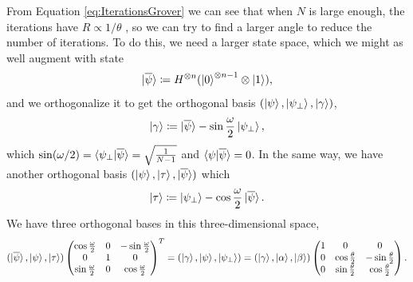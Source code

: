 \documentclass[a4paper,10pt]{book}
\numberwithin{equation}{section}
\begin{document}
From Equation \ref{eq:IterationsGrover} we can see that when $N$ is large enough, the iterations have $R\propto 1/\theta$ , so we can try to find a larger angle to reduce the number of iterations. To do this, we need a larger state space, which we might as well augment with state
\begin{equation}
    \ket{\overline{\psi}}\coloneqq H^{\otimes n}(\ket{0}^{\otimes n-1}\otimes\ket{1}),
\end{equation}
and we orthogonalize it to get the orthogonal basis $(\ket{\psi},\ket{\psi_{\perp}},\ket{\gamma})$,
\begin{equation}
    \ket{\gamma}\coloneqq \ket{\overline{\psi}}-\sin\frac{\omega}{2}\ket{\psi_{\perp}},
\end{equation}
which $\sin(\omega/2)=\braket{\psi_{\perp}|\overline{\psi}}=\sqrt{\frac{1}{N-1}}$ and $\braket{\psi|\overline{\psi}}=0$. In the same way, we have another orthogonal basis $(\ket{\psi},\ket{\tau},\ket{\overline{\psi}})$ which
\begin{equation}
    \ket{\tau}\coloneqq \ket{\psi_{\perp}}-\cos\frac{\omega}{2}\ket{\overline{\psi}}.
\end{equation}
We have three orthogonal bases in this three-dimensional space,
\begin{equation*}
    (\ket{\overline{\psi}},\ket{\psi},\ket{\tau})
    \begin{pmatrix}
        \cos\frac{\omega}{2} & 0 & -\sin\frac{\omega}{2} \\
        0                    & 1 & 0                     \\
        \sin\frac{\omega}{2} & 0 & \cos\frac{\omega}{2}
    \end{pmatrix}
    ^{T}=(\ket{\gamma},\ket{\psi},\ket{\psi_{\perp}})
    =(\ket{\gamma},\ket{\alpha},\ket{\beta})
    \begin{pmatrix}
        1 & 0                    & 0                     \\
        0 & \cos\frac{\theta}{2} & -\sin\frac{\theta}{2} \\
        0 & \sin\frac{\theta}{2} & \cos\frac{\theta}{2}
    \end{pmatrix}
    .
\end{equation*}





\end{document}
